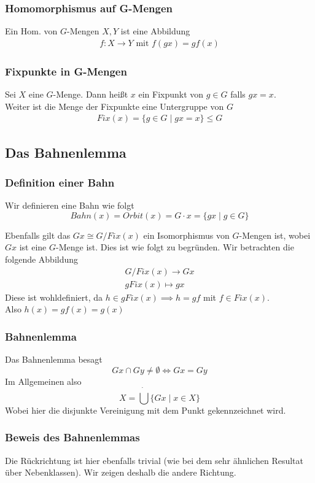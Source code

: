 \documentclass[12pt, german]{article}
\begin{document}
	\subsubsection{Homomorphismus auf G-Mengen}
	Ein Hom. von $G$-Mengen $X,Y$ ist eine Abbildung 
	\begin{align*}
		f: X \to Y \text{ mit } f(gx) = gf(x)
	\end{align*}
	
	\subsubsection{Fixpunkte in G-Mengen}
	Sei $X$ eine  $G$-Menge. Dann heißt $x$ ein Fixpunkt von $g \in G$ falls $gx=x$. \\
	Weiter ist die Menge der Fixpunkte eine Untergruppe von $G$
	\begin{align*}
		Fix(x) = \{g \in G \mid  gx = x\} \leq G 
	\end{align*}
	
	
	\subsection{Das Bahnenlemma}		
	\subsubsection{Definition einer Bahn}
	Wir definieren eine Bahn wie folgt $$Bahn(x) = Orbit(x) = G\cdot x = \{gx \mid  g \in G \}$$
	
	
	Ebenfalls gilt das $Gx \cong G/Fix(x)$ ein Isomorphismus von $G$-Mengen ist, wobei $Gx$ ist eine $G$-Menge ist. 
	Dies ist wie folgt zu begründen. Wir betrachten die folgende Abbildung
	\begin{align*}
		G/Fix(x) \to Gx \\ 
		gFix(x) \mapsto gx
	\end{align*}
	Diese ist wohldefiniert, da $h \in gFix(x) \implies h=gf$ mit $f \in Fix(x)$. \\ 
	Also $h(x) = gf(x) = g(x)$ 
	
	
	\subsubsection{Bahnenlemma}
	Das Bahnenlemma besagt $$Gx \cap Gy \not = \emptyset \iff Gx = Gy$$
	Im Allgemeinen also $$ X = \dot{\bigcup} \{Gx \mid  x \in X \}$$ Wobei hier die disjunkte Vereinigung mit dem Punkt gekennzeichnet wird. 
	\subsubsection{Beweis des Bahnenlemmas}
	Die Rückrichtung ist hier ebenfalls trivial (wie bei dem sehr ähnlichen Resultat über Nebenklassen). Wir zeigen deshalb die andere Richtung. \\ 
	
\end{document}

